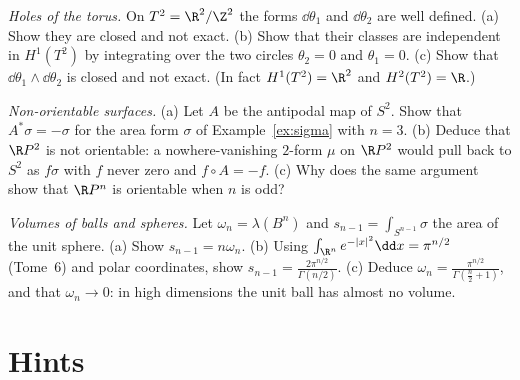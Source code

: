 \begin{exercise}[$\star$]\label{ex:toruscohomology}
\emph{Holes of the torus.} On $T^2=\R^2/\Z^2$ the forms $\dd\theta_1$ and $\dd\theta_2$ are well defined. (a) Show they are closed and not exact. (b) Show that their classes
are independent in $H^1(T^2)$ by integrating over the two circles $\theta_2=0$ and $\theta_1=0$. (c) Show that $\dd\theta_1\wedge\dd\theta_2$ is closed and not exact. (In fact
$H^1(T^2)=\R^2$ and $H^2(T^2)=\R$.)
\end{exercise}

\begin{exercise}[$\star\star$]\label{ex:mobius}
\emph{Non-orientable surfaces.} (a) Let $A$ be the antipodal map of $S^2$. Show that $A^*\sigma=-\sigma$ for the area form $\sigma$ of Example~\ref{ex:sigma} with $n=3$. (b) Deduce that
$\R P^2$ is not orientable: a nowhere-vanishing $2$-form $\mu$ on $\R P^2$ would pull back to $S^2$ as $f\sigma$ with $f$ never zero and $f\circ A=-f$. (c) Why does the same argument
show that $\R P^n$ is orientable when $n$ is odd?
\end{exercise}

\begin{exercise}[$\star\star$]\label{ex:spherevolume}
\emph{Volumes of balls and spheres.} Let $\omega_n=\lambda(B^n)$ and $s_{n-1}=\int_{S^{n-1}}\sigma$ the area of the unit sphere. (a) Show $s_{n-1}=n\omega_n$. (b) Using
$\int_{\R^n}e^{-|x|^2}\dd x=\pi^{n/2}$ (Tome~6) and polar coordinates, show $s_{n-1}=\frac{2\pi^{n/2}}{\Gamma(n/2)}$. (c) Deduce $\omega_n=\frac{\pi^{n/2}}{\Gamma(\frac n2+1)}$, and that
$\omega_n\to0$: in high dimensions the unit ball has almost no volume.
\end{exercise}

\section{Hints}

